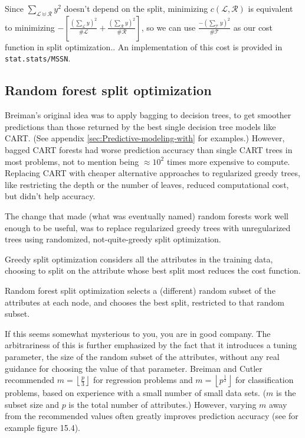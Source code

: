 \documentclass[11pt,openany,american,usenames,dvipsnames,svgnames,x11names,table,isodate]{article}
\numberwithin{equation}{section}
\numberwithin{figure}{section}
\begin{document}
Since $\sum_{\mathcal{L}\uplus\mathcal{R}}y^{2}$ doesn't depend on
the split, minimizing $c\left(\mathcal{L},\mathcal{R}\right)$ is
equivalent to minimizing $-\left[\frac{\left(\sum_{\mathcal{L}}y\right)^{2}}{\#\mathcal{L}}+\frac{\left(\sum_{\mathcal{R}}y\right)^{2}}{\#\mathcal{R}}\right]$,
so we can use $\frac{-\left(\sum_{\mathcal{T}}y\right)^{2}}{\#\mathcal{T}}$
as our cost function in split optimization.. An implementation of
this cost is provided in \texttt{stat.stats/MSSN}.

\subsection{Random forest split optimization}

Breiman's original idea was to apply bagging to decision trees, to
get smoother predictions than those returned by the best single decision
tree models like CART\cite{breiman-friedman-olshen-stone-1984}. (See
appendix \ref{sec:Predictive-modeling-with} for examples.) However,
bagged CART forests had worse prediction accuracy than single CART
trees in most problems, not to mention being $\approx10^{2}$ times
more expensive to compute. Replacing CART with cheaper alternative
approaches to regularized greedy trees, like restricting the depth
or the number of leaves, reduced computational cost, but didn't help
accuracy.

The change that made (what was eventually named) random forests work
well enough to be useful, was to replace regularized greedy trees
with unregularized trees using randomized, not-quite-greedy split
optimization. 

Greedy split optimization considers all the attributes in the training
data, choosing to split on the attribute whose best split most reduces
the cost function. 

Random forest split optimization selects a (different) random subset
of the attributes at each node, and chooses the best split, restricted
to that random subset. 

If this seems somewhat mysterious to you, you are in good company.
The arbitrariness of this is further emphasized by the fact that it
introduces a tuning parameter, the size of the random subset of the
attributes, without any real guidance for choosing the value of that
parameter. Breiman and Cutler recommended $m=\left\lfloor \frac{p}{3}\right\rfloor $
for regression problems and $m=\left\lfloor p^{\frac{1}{2}}\right\rfloor $
for classification problems, based on experience with a small number
of small data sets. ($m$ is the subset size and $p$ is the total
number of attributes.) However, varying $m$ away from the recommended
values often greatly improves prediction accuracy (see for example
\cite{hastie-tibshirani-friedman-2009} figure 15.4).
\end{document}
